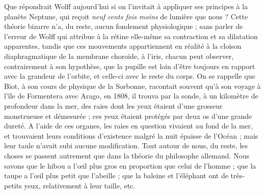 \documentclass[a4paper, 11pt, oneside, landscape]{article}
\begin{document}
Que répondrait Wolff aujourd'hui si on l'invitait à appliquer ses principes à la planète Neptune, qui reçoit \emph{neuf cents fois moins} de lumière que nous ? Cette théorie bizarre n'a, du reste, aucun fondement physiologique ; sans parler de l'erreur de Wolff qui attribue à la rétine elle-même sa contraction et sa dilatation apparentes, tandis que ces mouvements appartiennent en réalité à la cloison diaphragmatique de la membrane choroïde, à l'iris, chacun peut observer, contrairement à son hypothèse, que la pupille est loin d'être toujours en rapport avec la grandeur de l'orbite, et celle-ci avec le reste du corps. On se rappelle que Biot, à son cours de physique de la Sorbonne, racontait souvent qu'à son voyage à l'île de Formentera avec Arago, en 1808, il trouva par la sonde, à un kilomètre de profondeur dans la mer, des raies dont les yeux étaient d'une grosseur monstrueuse et démesurée ; ces yeux étaient protégés par deux os d'une grande dureté. A l'aide de ces organes, les raies en question vivaient au fond de la mer, et trouvaient leurs conditions d'existence malgré la nuit épaisse de l'Océan ; mais leur taule n'avait subi aucune modification. Tout autour de nous, du reste, les choses se passent autrement que dans la théorie du philosophe allemand. Nous savons que le hibou a l'œil plus gros en proportion que celui de l'homme ; que la taupe a l'œil plus petit que l'abeille ; que la baleine et l'éléphant ont de très-petits yeux, relativement à leur taille, etc.
\end{document}
